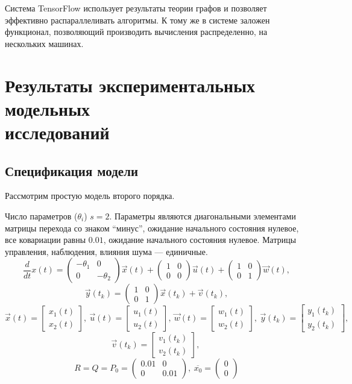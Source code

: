 \documentclass[a4paper,14pt]{extarticle}
\begin{document}
Система TensorFlow использует результаты теории графов и позволяет эффективно 
распараллеливать алгоритмы. К тому же в системе заложен функционал, позволяющий
производить вычисления распределенно, на нескольких машинах.

\newpage
\section[Результаты экспериментальных модельных исследований]
{Результаты экспериментальных модельных \\исследований} 


\subsection{Спецификация модели}
Рассмотрим простую модель второго порядка. 

Число параметров ($\theta_i$) $s = 2$. Параметры являются диагональными
элементами матрицы перехода со знаком ``минус'', ожидание начального состояния
нулевое, все ковариации равны $0.01$, ожидание начального состояния нулевое.
Матрицы управления, наблюдения, влияния шума --- единичные.
\[
	\frac{d}{dt}x(t) =
		\begin{pmatrix}
			-\theta_1 & 0 \\
			0 & -\theta_2
		\end{pmatrix}
		\vec{x}(t) +
		\begin{pmatrix}
			1 & 0 \\
			0 & 0
		\end{pmatrix}
		\vec{u}(t) +
		\begin{pmatrix}
			1 & 0 \\
			0 & 1
		\end{pmatrix}
		\vec{w}(t),
\]
\[
	\vec{y}(t_k) =
	\begin{pmatrix}
		1 & 0 \\
		0 & 1
	\end{pmatrix}
	\vec{x}(t_k) + \vec{v}(t_k),
\]
\[
	\vec{x}(t) = \begin{bmatrix} x_1(t) \\ x_2(t) \end{bmatrix},\ 
	\vec{u}(t) = \begin{bmatrix} u_1(t) \\ u_2(t) \end{bmatrix},\
	\vec{w}(t) = \begin{bmatrix} w_1(t) \\ w_2(t) \end{bmatrix},\
	\vec{y}(t_k) = \begin{bmatrix} y_1(t_k) \\ y_2(t_k) \end{bmatrix},\
\]
\[
	\vec{v}(t_k) = \begin{bmatrix} v_1(t_k) \\ v_2(t_k) \end{bmatrix},\
\]
\[
	R = Q = P_0 = \begin{pmatrix} 0.01 & 0 \\ 0 & 0.01 \end{pmatrix},\
	\overline{x_0} = \begin{pmatrix} 0 \\ 0 \end{pmatrix}
\]
\end{document}
